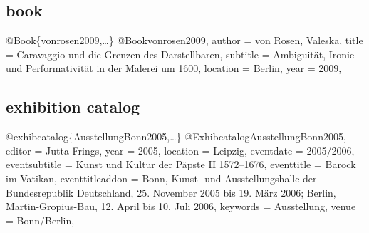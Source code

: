 \documentclass[a4paper,
10pt,
ngerman,
english
]{ltxdoc}
\begin{document}

\subsection{book}
\begin{bibexample}[label=vonrosen2009]{{@}Book\{vonrosen2009,…\}}
@Book{vonrosen2009,
  author   = {von Rosen, Valeska},
  title    = {Caravaggio und die Grenzen des Darstellbaren},
  subtitle = {Ambiguität, Ironie und Performativität in der Malerei um 1600},
  location = {Berlin},
  year     = {2009},
}
\end{bibexample}

\subsection{exhibition catalog}
\begin{bibexample}[label=AusstellungBonn2005]{{@}exhibcatalog\{AusstellungBonn2005,…\}}
@Exhibcatalog{AusstellungBonn2005,
  editor          = {Jutta Frings},
  year            = {2005},
  location        = {Leipzig},
  eventdate       = {2005/2006},
  eventsubtitle   = {Kunst und Kultur der Päpste II 1572--1676},
  eventtitle      = {Barock im Vatikan},
  eventtitleaddon = {Bonn, Kunst- und Ausstellungshalle der Bundesrepublik Deutschland, 25. November 2005 bis 19. März 2006; Berlin, Martin-Gropius-Bau, 12. April bis 10. Juli 2006},
  keywords        = {Ausstellung},
  venue           = {Bonn/Berlin},
}
\end{bibexample}
\end{document}
